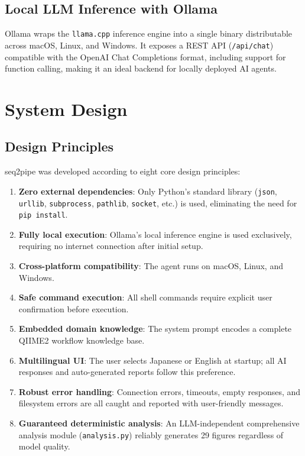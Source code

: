 \documentclass[12pt, a4paper]{article}
\begin{document}
\subsection{Local LLM Inference with Ollama}

Ollama wraps the \texttt{llama.cpp} inference engine into a single binary
distributable across macOS, Linux, and Windows.
It exposes a REST API (\texttt{/api/chat}) compatible with the
OpenAI Chat Completions format, including support for function calling,
making it an ideal backend for locally deployed AI agents.

\section{System Design}

\subsection{Design Principles}

seq2pipe was developed according to eight core design principles:

\begin{enumerate}[leftmargin=2em]
  \item \textbf{Zero external dependencies}:
    Only Python's standard library (\texttt{json}, \texttt{urllib},
    \texttt{subprocess}, \texttt{pathlib}, \texttt{socket}, etc.) is used,
    eliminating the need for \texttt{pip install}.
  \item \textbf{Fully local execution}:
    Ollama's local inference engine is used exclusively,
    requiring no internet connection after initial setup.
  \item \textbf{Cross-platform compatibility}:
    The agent runs on macOS, Linux, and Windows.
  \item \textbf{Safe command execution}:
    All shell commands require explicit user confirmation before execution.
  \item \textbf{Embedded domain knowledge}:
    The system prompt encodes a complete QIIME2 workflow knowledge base.
  \item \textbf{Multilingual UI}:
    The user selects Japanese or English at startup; all AI responses
    and auto-generated reports follow this preference.
  \item \textbf{Robust error handling}:
    Connection errors, timeouts, empty responses, and filesystem errors
    are all caught and reported with user-friendly messages.
  \item \textbf{Guaranteed deterministic analysis}:
    An LLM-independent comprehensive analysis module (\texttt{analysis.py})
    reliably generates 29 figures regardless of model quality.
\end{enumerate}
\end{document}
